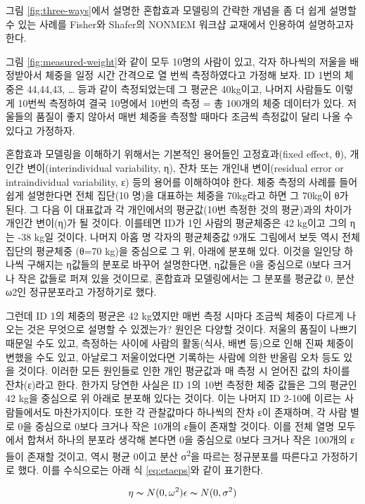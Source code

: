 \documentclass[
  10pt,
]{krantz}
\begin{document}
그림 \ref{fig:three-ways}에서 설명한 혼합효과 모델링의 간략한 개념을 좀 더 쉽게 설명할 수 있는 사례를 Fisher와 Shafer의 NONMEM 워크샵 교재에서 인용하여 설명하고자 한다.

그림 \ref{fig:measured-weight}와 같이 모두 10명의 사람이 있고, 각자 하나씩의 저울을 배정받아서 체중을 일정 시간 간격으로 열 번씩 측정하였다고 가정해 보자. ID 1번의 체중은 44,44,43, \ldots{} 등과 같이 측정되었는데 그 평균은 40kg이고, 나머지 사람들도 이렇게 10번씩 측정하여 결국 10명에서 10번의 측정 = 총 100개의 체중 데이터가 있다. 저울들의 품질이 좋지 않아서 매번 체중을 측정할 때마다 조금씩 측정값이 달리 나올 수 있다고 가정하자.

혼합효과 모델링을 이해하기 위해서는 기본적인 용어들인 고정효과(fixed effect, θ), 개인간 변이(interindividual variability, η), 잔차 또는 개인내 변이(residual error or intraindividual variability, ε) 등의 용어를 이해하여야 한다. 체중 측정의 사례를 들어 쉽게 설명한다면 전체 집단(10 명)을 대표하는 체중을 70kg라고 하면 그 70kg이 θ가 된다. 그 다음 이 대표값과 각 개인에서의 평균값(10번 측정한 것의 평균)과의 차이가 개인간 변이(η)가 될 것이다. 이를테면 ID가 1인 사람의 평균체중은 42 kg이고 그의 η는 -38 kg일 것이다. 나머지 아홉 명 각자의 평균체중값 9개도 그림에서 보듯 역시 전체 집단의 평균체중 (θ=70 kg)을 중심으로 그 위, 아래에 분포해 있다. 이것을 일인당 하나씩 구해지는 η값들의 분포로 바꾸어 설명한다면, η값들은 0을 중심으로 0보다 크거나 작은 값들로 퍼져 있을 것이므로, 혼합효과 모델링에서는 그 분포를 평균값 0, 분산 ω2인 정규분포라고 가정하기로 했다.

그런데 ID 1의 체중의 평균은 42 kg였지만 매번 측정 시마다 조금씩 체중이 다르게 나오는 것은 무엇으로 설명할 수 있겠는가? 원인은 다양할 것이다. 저울의 품질이 나쁘기 때문일 수도 있고, 측정하는 사이에 사람의 활동(식사, 배변 등)으로 인해 진짜 체중이 변했을 수도 있고, 아날로그 저울이었다면 기록하는 사람에 의한 반올림 오차 등도 있을 것이다. 이러한 모든 원인들로 인한 개인 평균값과 매 측정 시 얻어진 값의 차이를 잔차(ε)라고 한다. 한가지 당연한 사실은 ID 1의 10번 측정한 체중 값들은 그의 평균인 42 kg을 중심으로 위 아래로 분포해 있다는 것이다. 이는 나머지 ID 2-10에 이르는 사람들에서도 마찬가지이다. 또한 각 관찰값마다 하나씩의 잔차 ε이 존재하며, 각 사람 별로 0을 중심으로 0보다 크거나 작은 10개의 ε들이 존재할 것이다. 이를 전체 열명 모두에서 합쳐서 하나의 분포라 생각해 본다면 0을 중심으로 0보다 크거나 작은 100개의 ε들이 존재할 것이고, 역시 평균 0이고 분산 σ\textsuperscript{2}을 따르는 정규분포를 따른다고 가정하기로 했다. 이를 수식으로는 아래 식 \eqref{eq:etaeps}와 같이 표기한다.

\begin{equation} 
  \eta \thicksim N (0, \omega^2) \\
  \epsilon \thicksim N (0, \sigma^2)
  \label{eq:etaeps}
\end{equation}
\end{document}
